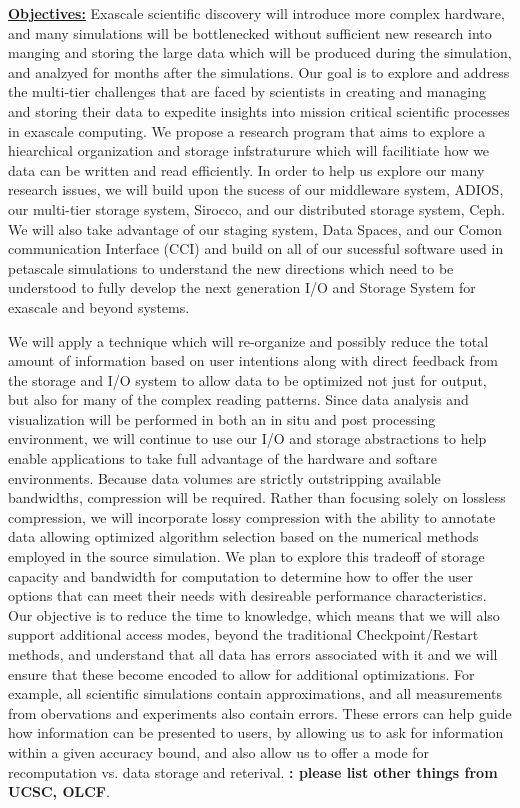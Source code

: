 \documentclass[11pt,letterpaper]{article}
\begin{document}
\underline{\textbf{Objectives:}} Exascale scientific discovery will
introduce more complex hardware, and many simulations will be bottlenecked 
without sufficient new research into manging and storing the large data which will be
produced during the simulation, and analzyed for months after the simulations.
Our goal is to explore and address
the multi-tier challenges that are faced by scientists in creating and
managing and storing their data  to expedite insights into
mission critical scientific processes in exascale computing.
%
We propose a research program that aims to explore a hiearchical organization and storage infstraturure which will facilitiate 
how we data can be written and read efficiently. In order to help us explore our many research issues, we will build upon the
sucess of our middleware system, ADIOS, our multi-tier storage system, Sirocco, and our distributed storage system, Ceph.
We will also take advantage of our staging system, Data Spaces, and our Comon communication Interface (CCI) and build on all of
our sucessful software used in petascale simulations to understand the new directions which need to be understood to fully develop
the next generation I/O and Storage System for exascale and beyond systems.

%
We will apply a technique which will re-organize and possibly reduce the total amount of information based on user intentions along
with direct feedback from the storage and I/O system to allow data to be optimized not just for output, but also for many of the complex
reading patterns. Since data analysis and visualization will be performed in both an in situ and post processing environment, 
we will continue to use our I/O and storage abstractions to help enable applications to take full advantage of the hardware and softare 
environments. Because data volumes are strictly outstripping available bandwidths, compression will
be required. Rather than focusing solely on lossless compression, we will
incorporate lossy compression with the ability to annotate data allowing
optimized algorithm selection based on the numerical methods employed in the
source simulation. We plan to explore this tradeoff of storage capacity and
bandwidth for computation to determine how to offer the user options that can
meet their needs with desireable performance characteristics.
%
Our objective is to reduce the time to knowledge, which means that we will also support additional access modes, beyond the traditional 
Checkpoint/Restart methods, and understand that all data has errors associated with it and we will ensure that these become encoded to allow
for additional optimizations. For example, all scientific simulations contain approximations, and all measurements from obervations and experiments 
also contain errors. These errors can help guide how information can be presented to users, by allowing us to ask for information within a given 
accuracy bound, and also allow us to offer a mode for recomputation vs. data storage and reterival.  
%
{\bf: please list other things from UCSC, OLCF}.
%
\end{document}
